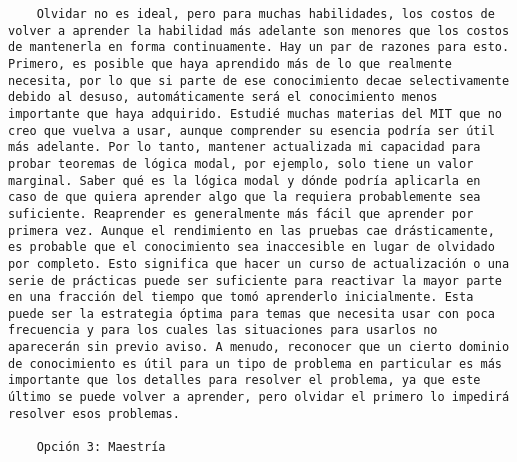 \begin{verbatim}
	Olvidar no es ideal, pero para muchas habilidades, los costos de volver a aprender la habilidad más adelante son menores que los costos de mantenerla en forma continuamente. Hay un par de razones para esto. Primero, es posible que haya aprendido más de lo que realmente necesita, por lo que si parte de ese conocimiento decae selectivamente debido al desuso, automáticamente será el conocimiento menos importante que haya adquirido. Estudié muchas materias del MIT que no creo que vuelva a usar, aunque comprender su esencia podría ser útil más adelante. Por lo tanto, mantener actualizada mi capacidad para probar teoremas de lógica modal, por ejemplo, solo tiene un valor marginal. Saber qué es la lógica modal y dónde podría aplicarla en caso de que quiera aprender algo que la requiera probablemente sea suficiente. Reaprender es generalmente más fácil que aprender por primera vez. Aunque el rendimiento en las pruebas cae drásticamente, es probable que el conocimiento sea inaccesible en lugar de olvidado por completo. Esto significa que hacer un curso de actualización o una serie de prácticas puede ser suficiente para reactivar la mayor parte en una fracción del tiempo que tomó aprenderlo inicialmente. Esta puede ser la estrategia óptima para temas que necesita usar con poca frecuencia y para los cuales las situaciones para usarlos no aparecerán sin previo aviso. A menudo, reconocer que un cierto dominio de conocimiento es útil para un tipo de problema en particular es más importante que los detalles para resolver el problema, ya que este último se puede volver a aprender, pero olvidar el primero lo impedirá resolver esos problemas.
	
	Opción 3: Maestría
	

\end{verbatim}
